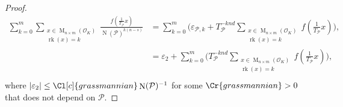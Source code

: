 \documentclass{amsart}
\theoremstyle{definition}
\theoremstyle{remark}
\DeclareMathOperator{\M}{M}
\DeclareMathOperator{\rank}{rk}
\DeclareMathOperator{\N}{N}
\begin{document}
\begin{proof}
{\begin{align}
            \sum_{k=0}^{m}\sum_{\substack{x \in \M_{n \times m }(\mathcal{O}_K) \\ \rank(x) = k}}
            \frac{  f( \tfrac{1}{T_{\mathcal{P}}} x)}{ \N(\mathcal{P})^{k(n-s)} } 
            & =     \sum_{k=0}^{m} \Big(\varepsilon_{\mathcal{P},k}+T_{\mathcal{P}}^{-knd}
                        \sum_{\substack{x \in \M_{n \times m }(\mathcal{O}_K) \\ \rank(x) = k}} 
                        {  f( \tfrac{1}{T_{\mathcal{P}}} x)} \Big),\\
            & =  \varepsilon_{2} +   \sum_{k=0}^{m} \Big(T_{\mathcal{P}}^{-knd}
                        \sum_{\substack{x \in \M_{n \times m }(\mathcal{O}_K) \\ \rank(x) = k}} 
                        {  f( \tfrac{1}{T_{\mathcal{P}}} x)} \Big),\\
    \end{align}}
    where $|\varepsilon_{2}| \leq \Cl[c]{grassmannian} \N(\mathcal{P})^{-1}$ for some $\Cr{grassmannian}>0$ that does not depend on $\mathcal{P}$.


\end{proof}
\end{document}
